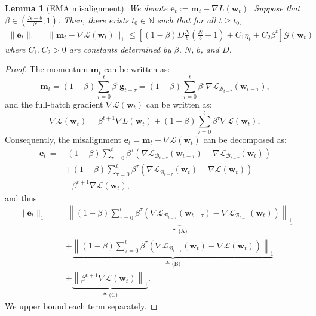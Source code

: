 \documentclass{article} %
\theoremstyle{plain}
\newtheorem{lemma}[theorem]{Lemma}
\theoremstyle{definition}
\theoremstyle{remark}
\def\gB{{\mathcal{B}}}
\def\gG{{\mathcal{G}}}
\newcommand{\Ls}{\mathcal{L}}
\def\bm{{\mathbf m}}
\def\be{{\mathbf e}}
\def\bw{{\mathbf w}}
\def\bg{{\mathbf g}}
\begin{document}
\begin{lemma}[EMA misalignment]\label{lemma:ema_misalign}
    We denote $\be_t:=\bm_t - \nabla L(\bw_t)$. Suppose that $\beta \in (\frac{N-b}{N}, 1)$. Then, there exists $t_0\in \mathbb N$ such that for all $t\geq t_0$,
    \begin{align*}
        \|\be_t\|_1 = \|\bm_t - \nabla \Ls(\bw_t)\|_1 \leq \left[ (1-\beta)D \tfrac Nb (\tfrac Nb -1) + C_1\eta_t + C_2 \beta^t \right] \gG(\bw_t)
    \end{align*}
    where $C_1, C_2 > 0$ are constants determined by $\beta$, $N$, $b$, and $D$.
\end{lemma}
\begin{proof}
    The momentum $\bm_t$ can be written as: \[
    \bm_t = (1-\beta) \sum_{\tau=0}^t \beta^\tau \bg_{t-\tau} = (1-\beta) \sum_{\tau=0}^t \beta^\tau \nabla \Ls_{\gB_{t-\tau}} (\bw_{t-\tau}),
    \]
    and the full-batch gradient $\nabla \Ls (\bw_t)$ can be written as: \[
    \nabla \Ls (\bw_t) = \beta^{t+1} \nabla L(\bw_t) + (1-\beta) \sum_{\tau=0}^t \beta^\tau \nabla \Ls (\bw_{t}),
    \]
    Consequently, the misalignment $\be_t = \bm_t - \nabla \Ls(\bw_t)$ can be decomposed as:
    \begin{align*}
    \be_t \,=&\,  (1-\beta) \sum_{\tau=0}^t \beta^\tau (\nabla \Ls_{\gB_{t-\tau}} (\bw_{t-\tau}) - \nabla \Ls_{\gB_{t-\tau}} (\bw_t)) \\
    &+ (1-\beta) \sum_{\tau=0}^t \beta^\tau (\nabla \Ls_{\gB_{t-\tau}} (\bw_t) - \nabla \Ls (\bw_t)) \\
    &- \beta^{t+1} \nabla \Ls (\bw_t),
    \end{align*}
    and thus
    \begin{align*}
    \|\be_t\|_1 \,=&\,  \underbrace{\left\| (1-\beta) \sum_{\tau=0}^t \beta^\tau (\nabla \Ls_{\gB_{t-\tau}} (\bw_{t-\tau}) - \nabla \Ls_{\gB_{t-\tau}} (\bw_t)) \right\|_1}_{\triangleq\textrm{ (A)}} \\
    &+ \underbrace{\left\| (1-\beta) \sum_{\tau=0}^t \beta^\tau (\nabla \Ls_{\gB_{t-\tau}} (\bw_t) - \nabla \Ls (\bw_t)) \right\|_1}_{\triangleq\textrm{ (B)}}\\
    & + \underbrace{\left\| \beta^{t+1} \nabla \Ls (\bw_t) \right\|_1}_{\triangleq\textrm{ (C)}}.
    \end{align*}
    We upper bound each term separately.


\end{proof}
\end{document}
